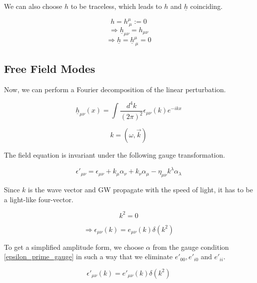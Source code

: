 We can also choose $h$ to be traceless, which leads to $h$ and $\underline{h}$ coinciding.

\begin{equation}
    h = h_{\ \mu}^\mu := 0
\end{equation}
\begin{equation}
    \Rightarrow \underline{h}_{\mu\nu}=h_{\mu\nu}
\end{equation}
\begin{equation}
    \Rightarrow \underline{h} = \underline{h}_{\ \mu}^\mu =0
\end{equation}

\subsection{Free Field Modes}

Now, we can perform a Fourier decomposition of the linear perturbation.

\begin{equation}
    \underline{h}_{\mu\nu}(x) = \int \frac{d^4k}{(2\pi)^2} \epsilon_{\mu\nu}(k)e^{-ikx}
\end{equation}

\begin{equation}
    k=(\omega, \vec{k})
\end{equation}

The field equation is invariant under the following gauge transformation. 

\begin{equation}
    \epsilon '_{\mu\nu}=\epsilon_{\mu\nu}+k_\mu \alpha_\nu + k_\nu \alpha_\mu - \eta_{\mu\nu}k^\lambda \alpha_\lambda
    \label{epsilon_prime_gauge}
\end{equation}

Since $k$ is the wave vector and GW propagate with the speed of light, it has to be a light-like four-vector.

\begin{equation}
    k^2=0
\end{equation}

\begin{equation}
    \Rightarrow \epsilon_{\mu\nu}(k) = e_{\mu\nu} (k)\delta(k^2)
\end{equation}

To get a simplified amplitude form, we choose $\alpha$ from the gauge condition \ref{epsilon_prime_gauge} in such a way that we eliminate $e'_{00}, e'_{i0}$ and $e'_{ii}$. 

\begin{equation}
    \epsilon '_{\mu\nu}(k) = e'_{\mu\nu} (k)\delta(k^2) 
\end{equation}

